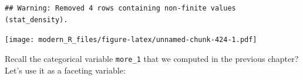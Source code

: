 \documentclass[]{gitbook}
\newenvironment{Shaded}{\begin{snugshade}}{\end{snugshade}}
\newcommand{\DataTypeTok}[1]{\textcolor[rgb]{0.13,0.29,0.53}{#1}}
\newcommand{\KeywordTok}[1]{\textcolor[rgb]{0.13,0.29,0.53}{\textbf{#1}}}
\newcommand{\NormalTok}[1]{#1}
\newcommand{\OperatorTok}[1]{\textcolor[rgb]{0.81,0.36,0.00}{\textbf{#1}}}
\newcommand{\StringTok}[1]{\textcolor[rgb]{0.31,0.60,0.02}{#1}}
\begin{document}
\begin{Shaded}
\end{Shaded}

\begin{verbatim}
## Warning: Removed 4 rows containing non-finite values (stat_density).
\end{verbatim}

\texttt{[image: modern\_R\_files/figure-latex/unnamed-chunk-424-1.pdf]}

Recall the categorical variable \texttt{more\_1} that we computed in the previous chapter? Let's use it as
a faceting variable:
\end{document}

